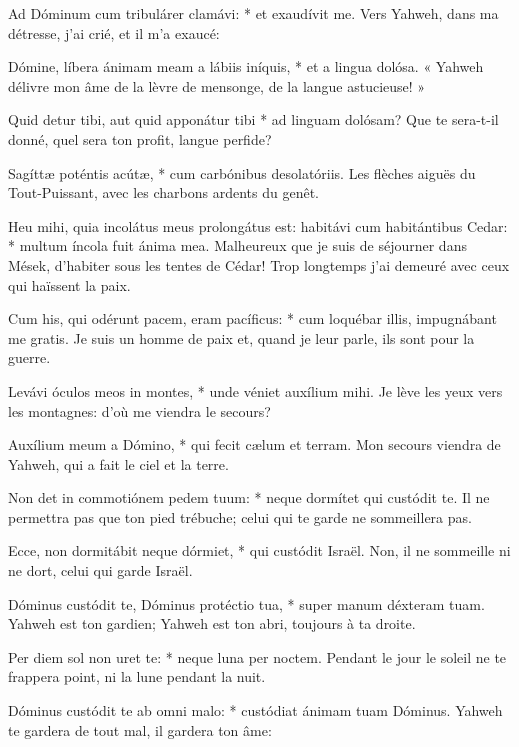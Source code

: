 \begin{paracol}{2}

\LigneParacol
{Ad Dóminum cum tribulárer clamávi: * et exaudívit me.}
{Vers Yahweh, dans ma détresse, j'ai crié, et il m'a exaucé:}

\LigneParacol
{Dómine, líbera ánimam meam a lábiis iníquis, * et a lingua dolósa.}
{« Yahweh délivre mon âme de la lèvre de mensonge, de la langue astucieuse! »}

\LigneParacol
{Quid detur tibi, aut quid apponátur tibi * ad linguam dolósam?}
{Que te sera-t-il donné, quel sera ton profit, langue perfide?}

\LigneParacol
{Sagíttæ poténtis acútæ, * cum carbónibus desolatóriis.}
{Les flèches aiguës du Tout-Puissant, avec les charbons ardents du genêt.}

\LigneParacol
{Heu mihi, quia incolátus meus prolongátus est: habitávi cum habitántibus Cedar: * multum íncola fuit ánima mea.}
{Malheureux que je suis de séjourner dans Mések, d'habiter sous les tentes de Cédar! Trop longtemps j'ai demeuré avec ceux qui haïssent la paix.}

\LigneParacol
{Cum his, qui odérunt pacem, eram pacíficus: * cum loquébar illis, impugnábant me gratis.}
{Je suis un homme de paix et, quand je leur parle, ils sont pour la guerre.}

\LigneParacol
{Levávi óculos meos in montes, * unde véniet auxílium mihi.}
{Je lève les yeux vers les montagnes: d'où me viendra le secours?}

\LigneParacol
{Auxílium meum a Dómino, * qui fecit cælum et terram.}
{Mon secours viendra de Yahweh, qui a fait le ciel et la terre.}

\LigneParacol
{Non det in commotiónem pedem tuum: * neque dormítet qui custódit te.}
{Il ne permettra pas que ton pied trébuche; celui qui te garde ne sommeillera pas.}

\LigneParacol
{Ecce, non dormitábit neque dórmiet, * qui custódit Israël.}
{Non, il ne sommeille ni ne dort, celui qui garde Israël.}

\LigneParacol
{Dóminus custódit te, Dóminus protéctio tua, * super manum déxteram tuam.}
{Yahweh est ton gardien; Yahweh est ton abri, toujours à ta droite.}

\LigneParacol
{Per diem sol non uret te: * neque luna per noctem.}
{Pendant le jour le soleil ne te frappera point, ni la lune pendant la nuit.}

\LigneParacol
{Dóminus custódit te ab omni malo: * custódiat ánimam tuam Dóminus.}
{Yahweh te gardera de tout mal, il gardera ton âme:}


\end{paracol}
